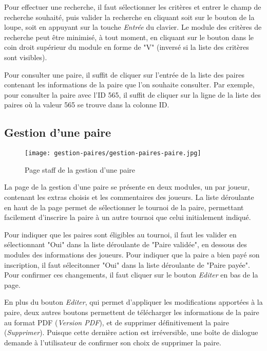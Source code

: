 Pour effectuer une recherche, il faut sélectionner les critères et entrer le champ de recherche souhaité, puis valider la recherche en cliquant soit sur le bouton de la loupe, soit en appuyant sur la touche \textit{Entrée} du clavier. Le module des critères de recherche peut être minimisé, à tout moment, en cliquant sur le bouton dans le coin droit supérieur du module en forme de "V" (inversé si la liste des critères sont visibles).\newline

Pour consulter une paire, il suffit de cliquer sur l'entrée de la liste des paires contenant les informations de la paire que l'on souhaite consulter. Par exemple, pour consulter la paire avec l'ID 565, il suffit de cliquer sur la ligne de la liste des paires où la valeur 565 se trouve dans la colonne ID.

\subsection{Gestion d'une paire}

\begin{figure}[H]
\centering
\texttt{[image: gestion-paires/gestion-paires-paire.jpg]}
\caption{Page staff de la gestion d'une paire}
\end{figure}

La page de la gestion d'une paire se présente en deux modules, un par joueur, contenant les extras choisis et les commentaires des joueurs. La liste déroulante en haut de la page permet de sélectionner le tournoi de la paire, permettant facilement d'inscrire la paire à un autre tournoi que celui initialement indiqué.\newline

Pour indiquer que les paires sont éligibles au tournoi, il faut les valider en sélectionnant "Oui" dans la liste déroulante de "Paire validée", en dessous des modules des informations des joueurs. Pour indiquer que la paire a bien payé son inscription, il faut sélecitonner "Oui" dans la liste déroulante de "Paire payée". Pour confirmer ces changements, il faut cliquer sur le bouton \textit{Editer} en bas de la page.\newline

En plus du bouton \textit{Editer}, qui permet d'appliquer les modifications apportées à la paire, deux autres boutons permettent de télécharger les informations de la paire au format PDF (\textit{Version PDF}), et de supprimer définitivement la paire (\textit{Supprimer}). Puisque cette dernière action est irréversible, une boîte de dialogue demande à l'utilisateur de confirmer son choix de supprimer la paire.
